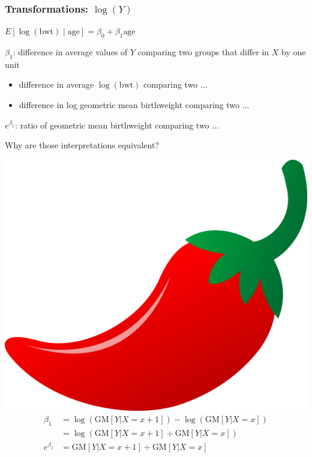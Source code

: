 \documentclass[10pt,t]{beamer}
\begin{document}
\begin{frame}
\frametitle{Transformations: $\log(Y)$}
\begin{center} $E[\log(\text{bwt})\mid \text{age}] = \beta_0 + \beta_1 \text{age}$ \end{center}
$\beta_1$: difference in average values of $Y$ comparing two groups that differ in $X$ by one unit\\ \pause
\begin{itemize}
	\item[] difference in average $\log(\text{bwt})$ comparing two ...\pause
	\item[] difference in log geometric mean birthweight comparing two ... \pause
\end{itemize}
\color{blue} $e^{\beta_1}$: ratio of geometric mean birthweight comparing two ... \color{black} \pause
\vspace{0.3cm}

Why are those interpretations equivalent?

\includegraphics[scale=0.01]{chilipepper.png}
\begin{align*}
\beta_1 & = \log(\text{GM}[Y|X=x+1])-\log(\text{GM}[Y|X=x])\\
& = \log\left(\text{GM}[Y|X=x+1]\div\text{GM}[Y|X=x]\right)\\
e^{\beta_1} & = \text{GM}[Y|X=x+1]\div\text{GM}[Y|X=x]
\end{align*}
\end{frame}
\end{document}
